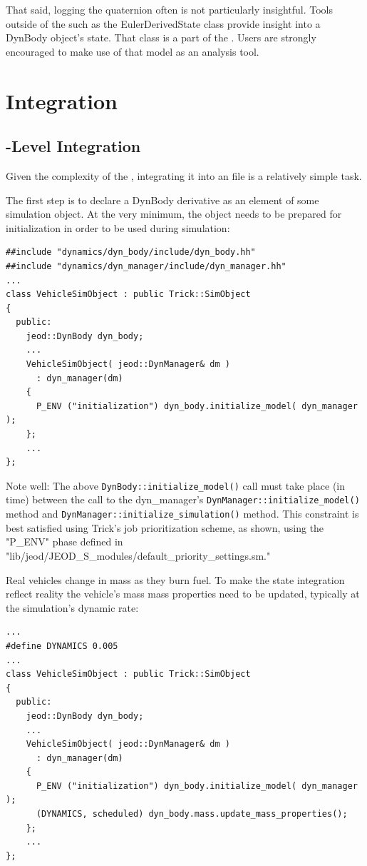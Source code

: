 That said, logging the quaternion often is not particularly insightful.
Tools outside of the \ModelDesc such as the EulerDerivedState class provide
insight into a DynBody object's state. That class is a part of the
. Users are strongly encouraged to make use of that
model as an analysis tool.

\section{Integration}
\subsection{\Sdefine-Level Integration}
Given the complexity of the \ModelDesc, integrating it into an \Sdefine file
is a relatively simple task.

The first step is to declare a DynBody derivative as an element of some
simulation object. At the very minimum, the object needs to be prepared for
initialization in order to be used during simulation:
\begin{verbatim}
##include "dynamics/dyn_body/include/dyn_body.hh"
##include "dynamics/dyn_manager/include/dyn_manager.hh"
...
class VehicleSimObject : public Trick::SimObject
{
  public:
    jeod::DynBody dyn_body;
    ...
    VehicleSimObject( jeod::DynManager& dm )
      : dyn_manager(dm)
    {
      P_ENV ("initialization") dyn_body.initialize_model( dyn_manager );
    };
    ...
};
\end{verbatim}
Note well: The above \verb+DynBody::initialize_model()+ call must take place
(in time) between the call to the dyn\_manager's \verb+DynManager::initialize_model()+
method and \verb+DynManager::initialize_simulation()+ method.
This constraint is best satisfied using Trick's job prioritization scheme, as
shown, using the "P\_ENV" phase defined in
"lib/jeod/JEOD\_S\_modules/default\_priority\_settings.sm."

Real vehicles change in mass as they burn fuel. To make the state integration
reflect reality the vehicle's mass mass properties need to be updated,
typically at the simulation's dynamic rate:
\begin{verbatim}
...
#define DYNAMICS 0.005
...
class VehicleSimObject : public Trick::SimObject
{
  public:
    jeod::DynBody dyn_body;
    ...
    VehicleSimObject( jeod::DynManager& dm )
      : dyn_manager(dm)
    {
      P_ENV ("initialization") dyn_body.initialize_model( dyn_manager );
      (DYNAMICS, scheduled) dyn_body.mass.update_mass_properties();
    };
    ...
};
\end{verbatim}

